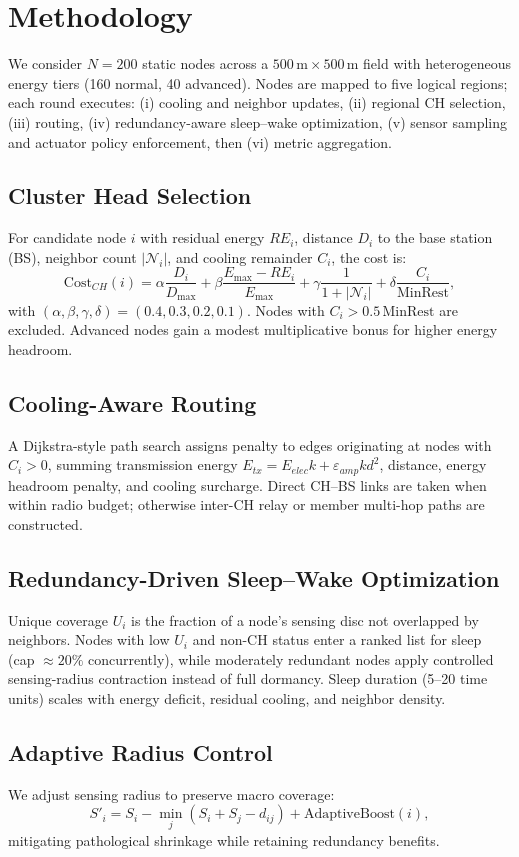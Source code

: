 \section{Methodology}
We consider $N=200$ static nodes across a $500\,\text{m} \times 500\,\text{m}$ field with heterogeneous energy tiers (160 normal, 40 advanced). Nodes are mapped to five logical regions; each round executes: (i) cooling and neighbor updates, (ii) regional CH selection, (iii) routing, (iv) redundancy-aware sleep--wake optimization, (v) sensor sampling and actuator policy enforcement, then (vi) metric aggregation.

\subsection{Cluster Head Selection}
For candidate node $i$ with residual energy $RE_i$, distance $D_i$ to the base station (BS), neighbor count $|\mathcal{N}_i|$, and cooling remainder $C_i$, the cost is:
\begin{equation}
\mathrm{Cost}_{CH}(i) = \alpha \frac{D_i}{D_{\max}} + \beta \frac{E_{\max} - RE_i}{E_{\max}} + \gamma \frac{1}{1+|\mathcal{N}_i|} + \delta \frac{C_i}{\text{MinRest}},
\end{equation}
with $(\alpha,\beta,\gamma,\delta)=(0.4,0.3,0.2,0.1)$. Nodes with $C_i > 0.5\,\text{MinRest}$ are excluded. Advanced nodes gain a modest multiplicative bonus for higher energy headroom.

\subsection{Cooling-Aware Routing}
A Dijkstra-style path search assigns penalty to edges originating at nodes with $C_i>0$, summing transmission energy $E_{tx}=E_{elec} k + \varepsilon_{amp} k d^2$, distance, energy headroom penalty, and cooling surcharge. Direct CH--BS links are taken when within radio budget; otherwise inter-CH relay or member multi-hop paths are constructed.

\subsection{Redundancy-Driven Sleep--Wake Optimization}
Unique coverage $U_i$ is the fraction of a node's sensing disc not overlapped by neighbors. Nodes with low $U_i$ and non-CH status enter a ranked list for sleep (cap $\approx 20\%$ concurrently), while moderately redundant nodes apply controlled sensing-radius contraction instead of full dormancy. Sleep duration (5--20 time units) scales with energy deficit, residual cooling, and neighbor density.

\subsection{Adaptive Radius Control}
We adjust sensing radius to preserve macro coverage:
\begin{equation}
S'_i = S_i - \min_j (S_i + S_j - d_{ij}) + \mathrm{AdaptiveBoost}(i),
\end{equation}
mitigating pathological shrinkage while retaining redundancy benefits.
